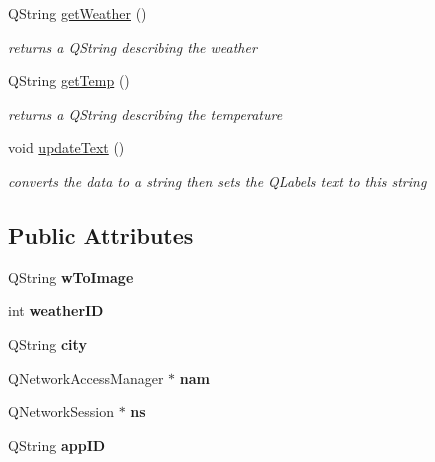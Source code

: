 \begin{DoxyCompactItemize}
Q\+String \mbox{\hyperlink{classweatherpanel_af8d593a8bc328ea0614f9bfb3ddf4f08}{get\+Weather}} ()
\begin{DoxyCompactList}\small\item\em returns a Q\+String describing the weather \end{DoxyCompactList}\item 
Q\+String \mbox{\hyperlink{classweatherpanel_a56fe31e2484d3266b9b039eaec58da7d}{get\+Temp}} ()
\begin{DoxyCompactList}\small\item\em returns a Q\+String describing the temperature \end{DoxyCompactList}\item 
void \mbox{\hyperlink{classweatherpanel_a8c4de1853c738dcf431f33a7a3ac56e4}{update\+Text}} ()
\begin{DoxyCompactList}\small\item\em converts the data to a string then sets the Q\+Labels text to this string \end{DoxyCompactList}\end{DoxyCompactItemize}
\subsection*{Public Attributes}
\begin{DoxyCompactItemize}
\item 
\mbox{\label{classweatherpanel_a8fad815741f5d5047e6d0c337a1016f7}} 
Q\+String {\bfseries w\+To\+Image}
\item 
\mbox{\label{classweatherpanel_a391826b3d7f3df11c41df7c182639084}} 
int {\bfseries weather\+ID}
\item 
\mbox{\label{classweatherpanel_ae3b988537592d93f7b3e188e3ff96ca1}} 
Q\+String {\bfseries city}
\item 
\mbox{\label{classweatherpanel_ad53cf408c768382d7f6f5471f1f3f6a9}} 
Q\+Network\+Access\+Manager $\ast$ {\bfseries nam}
\item 
\mbox{\label{classweatherpanel_aaaa5cb24a09525e123ef0b2f624d2d0f}} 
Q\+Network\+Session $\ast$ {\bfseries ns}
\item 
\mbox{\label{classweatherpanel_a0db73d897f7290fa37f3e3af183a3587}} 
Q\+String {\bfseries app\+ID}
\end{DoxyCompactItemize}
